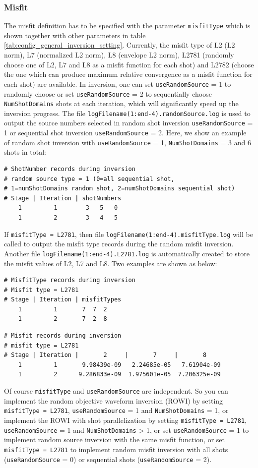 \documentclass[pdftex,a4paper,parskip,listof=totoc,bibliography=totoc,onehalfspacing,12pt]{scrreprt}
\begin{document}
\subsubsection{Misfit}
The misfit definition has to be specified with the parameter \verb+misfitType+ which is shown together with other parameters in table \ref{tab:config_general_inversion_setting}. Currently, the misfit type of L2 (L2 norm), L7 (normalized L2 norm), L8 (envelope L2 norm), L2781 (randomly choose one of L2, L7 and L8 as a misfit function for each shot) and L2782 (choose the one which can produce maximum relative convergence as a misfit function for each shot) are available. In inversion, one can set \verb+useRandomSource+ = 1 to randomly choose or set \verb+useRandomSource+ = 2 to sequentially choose \verb+NumShotDomains+ shots at each iteration, which will significantly speed up the inversion progress. The file \verb+logFilename(1:end-4).randomSource.log+ is used to output the source numbers selected in random shot inversion \verb+useRandomSource+ = 1 or sequential shot inversion \verb+useRandomSource+ = 2. Here, we show an example of random shot inversion with \verb+useRandomSource+ = 1, \verb+NumShotDomains+ = 3 and 6 shots in total:
\begin{verbatim}
# ShotNumber records during inversion
# random source type = 1 (0=all sequential shot,
# 1=numShotDomains random shot, 2=numShotDomains sequential shot)
# Stage | Iteration | shotNumbers
    1         1        3   5   0
    1         2        3   4   5
\end{verbatim}
If \verb+misfitType = L2781+, then file \verb+logFilename(1:end-4).misfitType.log+ will be called to output the misfit type records during the random misfit inversion. Another file \verb+logFilename(1:end-4).L2781.log+ is automatically created to store the misfit values of L2, L7 and L8. Two examples are shown as below:
\begin{verbatim}
# MisfitType records during inversion
# Misfit type = L2781
# Stage | Iteration | misfitTypes
    1         1       7  7  2
    1         2       7  2  8
\end{verbatim}
\begin{verbatim}
# Misfit records during inversion
# misfit type = L2781
# Stage | Iteration |       2     |       7     |       8      
    1         1       9.98439e-09   2.24685e-05   7.61904e-09
    1         2      9.286833e-09  1.975601e-05  7.206325e-09
\end{verbatim}
Of course \verb+misfitType+ and \verb+useRandomSource+ are independent. So you can implement the random objective waveform inversion (ROWI) \citep{pan2020random} by setting \verb+misfitType = L2781+, \verb+useRandomSource+ = 1 and \verb+NumShotDomains+ = 1, or implement the ROWI with shot parallelization by setting \verb+misfitType = L2781+, \verb+useRandomSource+ = 1 and \verb+NumShotDomains+ > 1, or set \verb+useRandomSource+ = 1 to implement random source inversion with the same misfit function, or set \verb+misfitType = L2781+ to implement random misfit inversion with all shots (\verb+useRandomSource+ = 0) or sequential shots (\verb+useRandomSource+ = 2).
\end{document}
